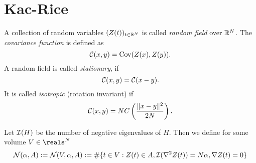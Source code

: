 \section{Kac-Rice}

\begin{definition}
	A collection of random variables \((Z(t))_{t\in\mathbb{R}^N}\) is called
	\emph{random field} over \(\mathbb{R}^N\). The \emph{covariance function}
	is defined as
	\begin{equation*}
		\mathcal{C}(x,y) = \operatorname{Cov}(Z(x), Z(y)).
	\end{equation*}
	A random field is called \emph{stationary}, if
	\begin{equation*}
		\mathcal{C}(x,y) = \mathcal{C}(x-y).
	\end{equation*}
	It is called \emph{isotropic} (rotation invariant) if	
	\begin{equation*}
		\mathcal{C}(x,y) = N C\left(\frac{\|x-y\|^2}{2N}\right).
	\end{equation*}
\end{definition}

\begin{definition}
	Let \(\mathcal{I}(H)\) be the number of negative eigenvalues of
	\(H\). Then we define for some volume \(\Vol\in\reals^\dimension\)
	\begin{equation*}
		\mathcal{N}(\alpha, A) := \mathcal{N}(V, \alpha, A)
		:= \#\{t\in V:
			Z(t)\in A,
			\mathcal{I}(\nabla^2 Z(t))=N\alpha,
			\nabla Z(t)=0
		\}	
	\end{equation*}
\end{definition}

\begin{theorem}

\end{theorem}